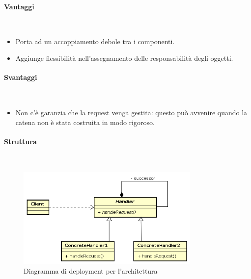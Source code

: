 \paragraph{Vantaggi} \mbox{} \\
\begin{itemize}
\item Porta ad un accoppiamento debole tra i componenti.
\item Aggiunge flessibilità nell’assegnamento delle responsabilità degli oggetti.
\end{itemize}
\paragraph{Svantaggi} \mbox{} \\
\begin{itemize}
\item Non c’è garanzia che la request venga gestita: questo può avvenire quando la catena non è stata costruita in modo rigoroso.
\end{itemize}
\paragraph{Struttura} \mbox{} \\
\begin{figure}[h]
\centering
\includegraphics[width=0.8\textwidth]{res/sections/backend/chainOfResponsability.png}
\caption{Diagramma di deployment per l'architettura}
\end{figure}